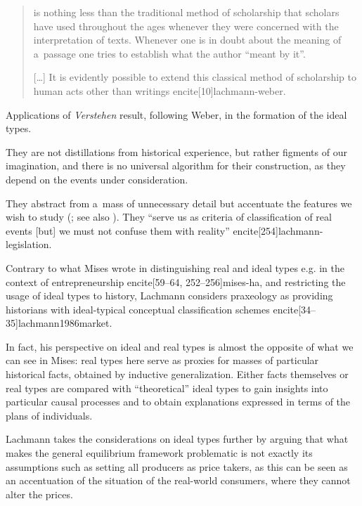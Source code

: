 {\begin{quote}

is nothing less than the traditional method of scholarship that scholars have used throughout the ages whenever they were concerned with the interpretation of texts. Whenever one is in doubt about the meaning of a~passage one tries to establish what the author ``meant by it''.

[\ldots] It is evidently possible to extend this classical method of scholarship to human acts other than writings encite[10]{lachmann-weber}.

\end{quote}



Applications of \emph{Verstehen} result, following Weber, in the formation of the ideal types.

They are not distillations from historical experience, but rather figments of our imagination, and there is no universal algorithm for their construction, as they depend on the events under consideration.

They abstract from a~mass of unnecessary detail but accentuate the features we wish to study (\cite[26--27]{lachmann-weber}; see also \cite[90]{weber}). They ``serve us as criteria of classification of real events [but] we must not confuse them with reality'' encite[254]{lachmann-legislation}.



Contrary to what Mises wrote in distinguishing real and ideal types e.g. in the context of entrepreneurship encite[59--64, 252--256]{mises-ha}, and restricting the usage of ideal types to history, Lachmann considers praxeology as providing historians with ideal-typical conceptual classification schemes encite[34--35]{lachmann1986market}.

In fact, his perspective on ideal and real types is almost the opposite of what we can see in Mises: real types here serve as proxies for masses of particular historical facts, obtained by inductive generalization. Either facts themselves or real types are compared with ``theoretical'' ideal types to gain insights into particular causal processes and to obtain explanations expressed in terms of the plans of individuals.



Lachmann takes the considerations on ideal types further by arguing that what makes the general equilibrium framework problematic is not exactly its assumptions such as setting all producers as price takers, as this can be seen as an accentuation of the situation of the real-world consumers, where they cannot alter the prices.

}
